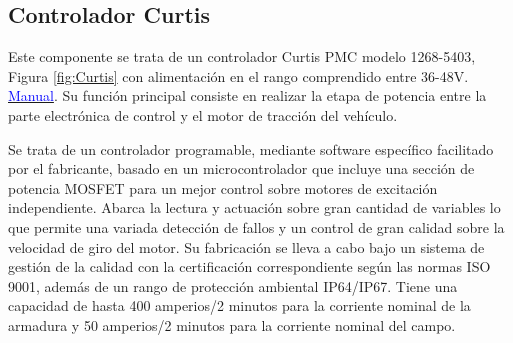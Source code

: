 \begin{figure}[!ht]
\centering
\end{figure}

\subsection{Controlador Curtis}\label{sec:3_Curtis}
Este componente se trata de un controlador Curtis PMC \cite{Controller2012} modelo 1268-5403, Figura \ref{fig:Curtis} con alimentación en el rango comprendido entre 36-48V. \href{https://github.com/ual-arm/ual-ecar-docs/blob/master/Datasheet/Curtis_1268.pdf}{\textcolor{blue}{Manual}}. Su función principal consiste en realizar la etapa de potencia entre la parte electrónica de control y el motor de tracción del vehículo.  

Se trata de un controlador programable, mediante software específico facilitado por el fabricante, basado en un microcontrolador que incluye una sección de potencia MOSFET para un mejor control sobre motores de excitación independiente. Abarca la lectura y actuación sobre gran cantidad de variables lo que permite una variada detección de fallos y un control de gran calidad sobre la velocidad de giro del motor. Su fabricación se lleva a cabo bajo un sistema de gestión de la calidad con la certificación correspondiente según las normas ISO 9001, además de un rango de protección ambiental IP64/IP67.  Tiene una capacidad de hasta 400 amperios/2 minutos para la corriente nominal de la armadura y 50 amperios/2 minutos para la corriente nominal del campo.

